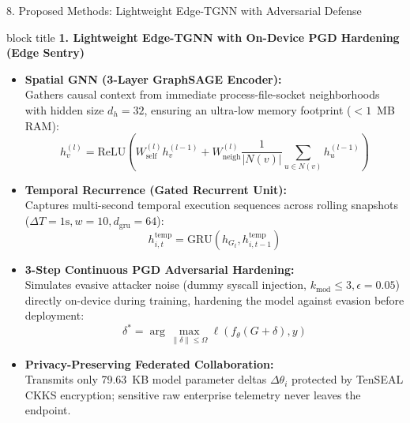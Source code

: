 \documentclass[aspectratio=169,10pt]{beamer}
\begin{document}
\begin{frame}[t]{8. Proposed Methods: Lightweight Edge-TGNN with Adversarial Defense}
\vspace{-0.25em}
\begin{beamercolorbox}[rounded=true,shadow=false,sep=0.30em,wd=\textwidth]{block title}
\textbf{\scriptsize 1. Lightweight Edge-TGNN with On-Device PGD Hardening (Edge Sentry)}
\end{beamercolorbox}
\vspace{0.08em}
{\fontsize{6.8pt}{9.2pt}\selectfont
\setlength{\abovedisplayskip}{1.5pt}
\setlength{\belowdisplayskip}{1.5pt}
\begin{itemize}\itemsep0.10em
  \item \textbf{Spatial GNN (3-Layer GraphSAGE Encoder):}\\
  Gathers causal context from immediate process-file-socket neighborhoods with hidden size $d_h=32$, ensuring an ultra-low memory footprint ($<1$~MB RAM):
  $$h_v^{(l)} = \text{ReLU}\left(W_{\text{self}}^{(l)} h_v^{(l-1)} + W_{\text{neigh}}^{(l)} \frac{1}{|N(v)|}\sum_{u \in N(v)} h_u^{(l-1)}\right)$$
  \item \textbf{Temporal Recurrence (Gated Recurrent Unit):}\\
  Captures multi-second temporal execution sequences across rolling snapshots ($\Delta T = 1\text{s}, w = 10, d_{\text{gru}}=64$):
  $$h_{i,t}^{\text{temp}} = \text{GRU}(h_{G_t}, h_{i,t-1}^{\text{temp}})$$
  \item \textbf{3-Step Continuous PGD Adversarial Hardening:}\\
  Simulates evasive attacker noise (dummy syscall injection, $k_{\text{mod}} \le 3, \epsilon=0.05$) directly on-device during training, hardening the model against evasion before deployment:
  $$\delta^* = \arg\max_{\|\delta\| \le \Omega} \ell(f_\theta(G+\delta), y)$$
  \item \textbf{Privacy-Preserving Federated Collaboration:}\\
  Transmits only 79.63~KB model parameter deltas $\Delta \theta_i$ protected by TenSEAL CKKS encryption; sensitive raw enterprise telemetry never leaves the endpoint.
\end{itemize}
}
\end{frame}
\end{document}
